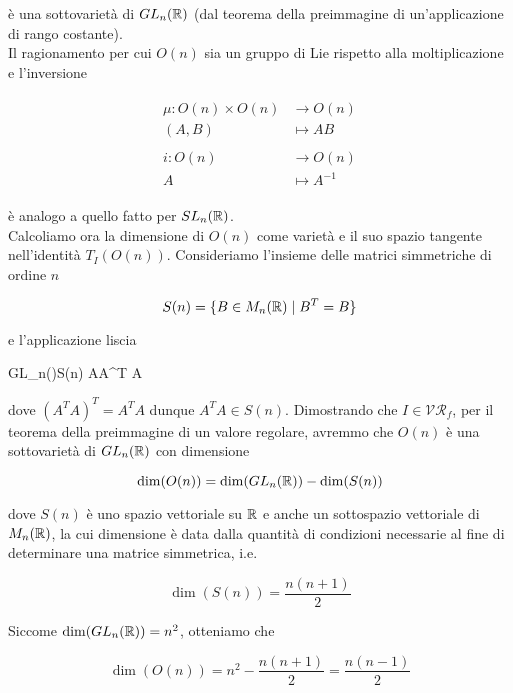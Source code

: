 è una sottovarietà di $ GL_{n}(\mathbb{R}) $ (dal teorema della preimmagine di un'applicazione di rango costante).\\
Il ragionamento per cui $ O(n) $ sia un gruppo di Lie rispetto alla moltiplicazione e l'inversione

\begin{align}
	\begin{split}
		\mu : O(n) \times O(n) &\to O(n)\\
		(A,B) &\mapsto A B\\\\
		i : O(n) &\to O(n)\\
		A &\mapsto A^{-1}
	\end{split}
\end{align}

è analogo a quello fatto per $ SL_{n}(\mathbb{R}) $.\\
Calcoliamo ora la dimensione di $ O(n) $ come varietà e il suo spazio tangente nell'identità $ T_{I}(O(n)) $. Consideriamo l'insieme delle matrici simmetriche di ordine $ n $

\begin{equation}
	S(n) = \{ B \in M_{n}(\mathbb{R}) \mid B^{T} = B \}
\end{equation}

e l'applicazione liscia

%
	{GL_{n}(\R)}{S(n)}%
	{A}{A^{T} A}

dove $ (A^{T} A)^{T} = A^{T} A $ dunque $ A^{T} A \in S(n) $. Dimostrando che $ I \in \mathcal{VR}_{f} $, per il teorema della preimmagine di un valore regolare, avremmo che $ O(n) $ è una sottovarietà di $ GL_{n}(\mathbb{R}) $ con dimensione

\begin{equation}
	\dim(O(n)) = \dim(GL_{n}(\mathbb{R})) - \dim(S(n))
\end{equation}

dove $ S(n) $ è uno spazio vettoriale su $ \mathbb{R} $ e anche un sottospazio vettoriale di $ M_{n}(\mathbb{R}) $, la cui dimensione è data dalla quantità di condizioni necessarie al fine di determinare una matrice simmetrica, i.e.

\begin{equation}
	\dim(S(n)) = \dfrac{n (n+1)}{2}
\end{equation}

Siccome $ \dim(GL_{n}(\mathbb{R})) = n^{2} $, otteniamo che

\begin{equation}
	\dim(O(n)) = n^{2} - \dfrac{n (n+1)}{2} = \dfrac{n (n-1)}{2}
\end{equation}

